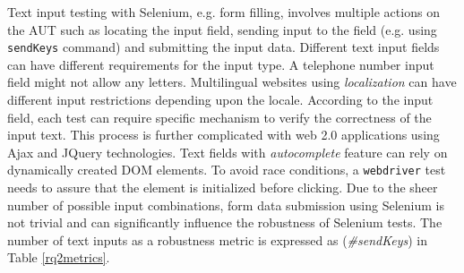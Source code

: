 Text input testing with Selenium, e.g. form filling, involves multiple actions on the AUT such as locating the input field, sending input to the field (e.g. using \texttt{sendKeys} command) and submitting the input data. Different text input fields can have different requirements for the input type. A telephone number input field might not allow any letters. Multilingual websites using \textit{localization} can have different input restrictions depending upon the locale. According to the input field, each test can require specific mechanism to verify the correctness of the input text. This process is further complicated with web 2.0 applications using Ajax and JQuery technologies. Text fields with \textit{autocomplete} feature can rely on dynamically created DOM elements. To avoid race conditions, a \texttt{webdriver} test needs to assure that the element is initialized before clicking. Due to the sheer number of possible input combinations, form data submission using Selenium is not trivial and can significantly influence the robustness of Selenium tests. The number of text inputs as a robustness metric is expressed as (\textit{\#sendKeys}) in Table \ref{rq2metrics}. 
